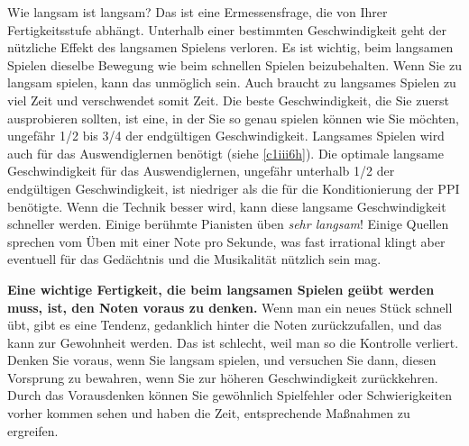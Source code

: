 Wie langsam ist langsam?
Das ist eine Ermessensfrage, die von Ihrer Fertigkeitsstufe abhängt.
Unterhalb einer bestimmten Geschwindigkeit geht der nützliche Effekt des langsamen Spielens verloren.
Es ist wichtig, beim langsamen Spielen dieselbe Bewegung wie beim schnellen Spielen beizubehalten.
Wenn Sie zu langsam spielen, kann das unmöglich sein.
Auch braucht zu langsames Spielen zu viel Zeit und verschwendet somit Zeit.
Die beste Geschwindigkeit, die Sie zuerst ausprobieren sollten, ist eine, in der Sie so genau spielen können wie Sie möchten, ungefähr 1/2 bis 3/4 der endgültigen Geschwindigkeit.
Langsames Spielen wird auch für das Auswendiglernen benötigt (siehe \hyperref[c1iii6h]{\autoref{c1iii6h}}).
Die optimale langsame Geschwindigkeit für das Auswendiglernen, ungefähr unterhalb 1/2 der endgültigen Geschwindigkeit, ist niedriger als die für die Konditionierung der PPI benötigte.
Wenn die Technik besser wird, kann diese langsame Geschwindigkeit schneller werden.
Einige berühmte Pianisten üben \textit{sehr langsam}!
Einige Quellen sprechen vom Üben mit einer Note pro Sekunde, was fast irrational klingt aber eventuell für das Gedächtnis und die Musikalität nützlich sein mag.

\textbf{Eine wichtige Fertigkeit, die beim langsamen Spielen geübt werden muss, ist, den Noten voraus zu denken.}
Wenn man ein neues Stück schnell übt, gibt es eine Tendenz, gedanklich hinter die Noten zurückzufallen, und das kann zur Gewohnheit werden.
Das ist schlecht, weil man so die Kontrolle verliert.
Denken Sie voraus, wenn Sie langsam spielen, und versuchen Sie dann, diesen Vorsprung zu bewahren, wenn Sie zur höheren Geschwindigkeit zurückkehren.
Durch das Vorausdenken können Sie gewöhnlich Spielfehler oder Schwierigkeiten vorher kommen sehen und haben die Zeit, entsprechende Maßnahmen zu ergreifen.



